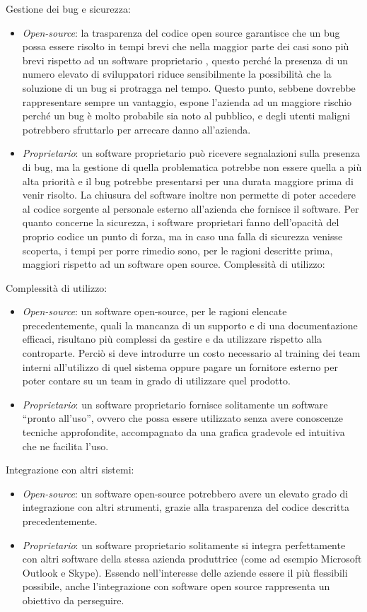 \documentclass[a4paper, 12pt]{report}
\numberwithin{equation}{section}
\begin{document}
Gestione dei bug e sicurezza:
\begin{itemize}
    \item \emph{Open-source}: la trasparenza del codice open source garantisce che un bug possa essere risolto in tempi brevi che nella maggior parte dei casi sono più brevi rispetto ad un software proprietario \cite{opensource-vs-proprietary-bugs}, questo perché la presenza di un numero elevato di sviluppatori riduce sensibilmente la possibilità che la soluzione di un bug si protragga nel tempo. Questo punto, sebbene dovrebbe rappresentare sempre un vantaggio, espone l’azienda ad un maggiore rischio perché un bug è molto probabile sia noto al pubblico, e degli utenti maligni potrebbero sfruttarlo per arrecare danno all’azienda.
    \item \emph{Proprietario}: un software proprietario può ricevere segnalazioni sulla presenza di bug, ma la gestione di quella problematica potrebbe non essere quella a più alta priorità e il bug potrebbe presentarsi per una durata maggiore prima di venir risolto. La chiusura del software inoltre non permette di poter accedere al codice sorgente al personale esterno all’azienda che fornisce il software. Per quanto concerne la sicurezza, i software proprietari fanno dell’opacità del proprio codice un punto di forza, ma in caso una falla di sicurezza venisse scoperta, i tempi per porre rimedio sono, per le ragioni descritte prima, maggiori rispetto ad un software open source.
Complessità di utilizzo:
\end{itemize}
Complessità di utilizzo:
\begin{itemize}
    \item \emph{Open-source}: un software open-source, per le ragioni elencate precedentemente, quali la mancanza di un supporto e di una documentazione efficaci, risultano più complessi da gestire e da utilizzare rispetto alla controparte. Perciò si deve introdurre un costo necessario al training dei team interni all’utilizzo di quel sistema oppure pagare un fornitore esterno per poter contare su un team in grado di utilizzare quel prodotto.
    \item \emph{Proprietario}: un software proprietario fornisce solitamente un software “pronto all’uso”, ovvero che possa essere utilizzato senza avere conoscenze tecniche approfondite, accompagnato da una grafica gradevole ed intuitiva che ne facilita l’uso.
\end{itemize}
Integrazione con altri sistemi:
\begin{itemize}
    \item \emph{Open-source}: un software open-source potrebbero avere un elevato grado di integrazione con altri strumenti, grazie alla trasparenza del codice descritta precedentemente.
    \item \emph{Proprietario}: un software proprietario solitamente si integra perfettamente con altri software della stessa azienda produttrice (come ad esempio Microsoft Outlook e Skype). Essendo nell’interesse delle aziende essere il più flessibili possibile, anche l’integrazione con software open source rappresenta un obiettivo da perseguire.
\end{itemize}
\end{document}
